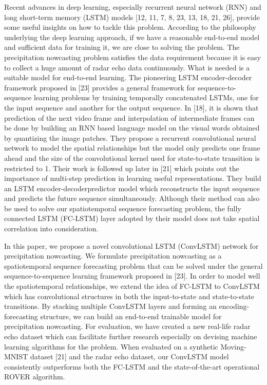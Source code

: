 \par Recent advances in deep learning, especially recurrent neural network (RNN) and long short-term memory (LSTM) models [12, 11, 7, 8, 23, 13, 18, 21, 26], provide some useful insights on how to tackle this problem. According to the philosophy underlying the deep learning approach, if we have a reasonable end-to-end model and sufficient data for training it, we are close to solving the problem. The precipitation nowcasting problem satisfies the data requirement because it is easy to collect a huge amount of radar echo data continuously. What is needed is a suitable model for end-to-end learning. The pioneering LSTM encoder-decoder framework proposed in [23] provides a general framework for sequence-to-sequence learning problems by training temporally concatenated LSTMs, one for the input sequence and another for the output sequence. In [18], it is shown that prediction of the next video frame and interpolation of intermediate frames can be done by building an RNN based language model on the visual words obtained by quantizing the image patches. They propose a recurrent convolutional neural network to model the spatial relationships but the model only predicts one frame ahead and the size of the convolutional kernel used for state-to-state transition is restricted to 1. Their work is followed up later in [21] which points out the importance of multi-step prediction in learning useful representations. They build an LSTM encoder-decoderpredictor model which reconstructs the input sequence and predicts the future sequence simultaneously. Although their method can also be used to solve our spatiotemporal sequence forecasting problem, the fully connected LSTM (FC-LSTM) layer adopted by their model does not take spatial correlation into consideration.

\par In this paper, we propose a novel convolutional LSTM (ConvLSTM) network for precipitation nowcasting. We formulate precipitation nowcasting as a spatiotemporal sequence forecasting problem that can be solved under the general sequence-to-sequence learning framework proposed in [23]. In order to model well the spatiotemporal relationships, we extend the idea of FC-LSTM to ConvLSTM which has convolutional structures in both the input-to-state and state-to-state transitions. By stacking multiple ConvLSTM layers and forming an encoding-forecasting structure, we can build an end-to-end trainable model for precipitation nowcasting. For evaluation, we have created a new real-life radar echo dataset which can facilitate further research especially on devising machine learning algorithms for the problem. When evaluated on a synthetic Moving-MNIST dataset [21] and the radar echo dataset, our ConvLSTM model consistently outperforms both the FC-LSTM and the state-of-the-art operational ROVER algorithm.

